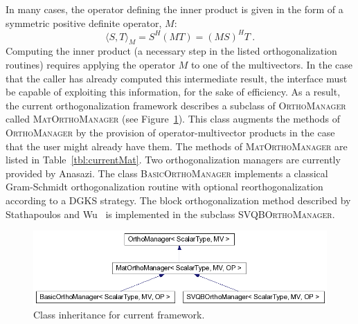 \documentclass[12pt,letterpaper]{SANDreport}
\theoremstyle{example}
\newcommand{\inner}[2]{\langle #1,#2 \rangle}
\begin{document}
In many cases, the operator defining the inner product is given in the form of a
symmetric positive definite operator, $M$:
\[
\inner{S}{T}_M = S^H (M T) = (M S)^H T\ .
\]
Computing the inner product (a necessary step in the listed orthogonalization routines)
requires applying the operator $M$ to one of the multivectors. In the case that the
caller has already computed this intermediate result, the interface must be capable of
exploiting this information, for the sake of efficiency. As a result, the current
orthogonalization framework describes a subclass of \textsc{OrthoManager} called
\textsc{MatOrthoManager} (see Figure~\ref{fig:oldhier}). This class augments the methods
of \textsc{OrthoManager} by the provision of operator-multivector products in the case
that the user might already have them. The methods of \textsc{MatOrthoManager} are listed
in Table~\ref{tbl:currentMat}.
Two orthogonalization managers are currently provided by Anasazi. The class
\textsc{BasicOrthoManager} implements a classical Gram-Schmidt orthogonalization routine
with optional reorthogonalization according to a DGKS strategy\cite{DGKS}.  The block
orthogonalization method described by Stathapoulos and Wu~\cite{SVQB} is implemented in
the subclass \textsc{SVQBOrthoManager}.

\begin{figure}[ht]
\begin{center}
\includegraphics[width=6.0in]{oldhier.png}
\end{center}
\caption{Class inheritance for current framework.}
\label{fig:oldhier}
\end{figure}
\end{document}
